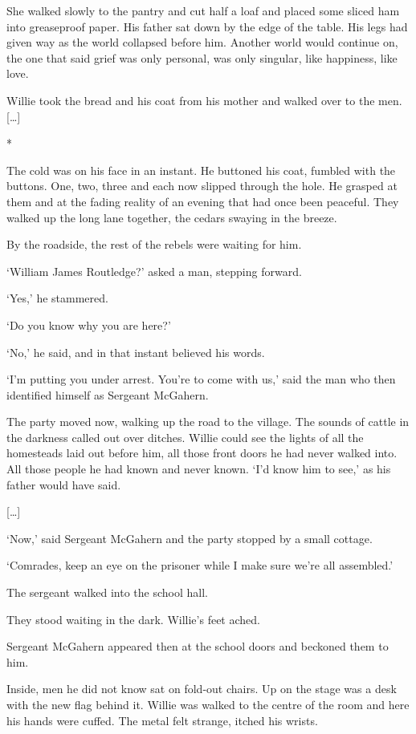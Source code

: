 \documentclass[10pt,a4paper]{article}
\begin{document}
She walked slowly to the pantry and cut half a loaf and placed some sliced ham into greaseproof paper. His father sat down by the edge of the table. His legs had given way as the world collapsed before him. Another world would continue on, the one that said grief was only personal, was only singular, like happiness, like love.

Willie took the bread and his coat from his mother and walked over to the men. […]

\begin{center}*\end{center}

The cold was on his face in an instant. He buttoned his coat, fumbled with the buttons. One, two, three and each now slipped through the hole. He grasped at them and at the fading reality of an evening that had once been peaceful. They walked up the long lane together, the cedars swaying in the breeze.

By the roadside, the rest of the rebels were waiting for him.

‘William James Routledge?’ asked a man, stepping forward.

‘Yes,’ he stammered.

‘Do you know why you are here?’

‘No,’ he said, and in that instant believed his words.

‘I’m putting you under arrest. You’re to come with us,’ said the man who then identified himself as Sergeant McGahern.

The party moved now, walking up the road to the village. The sounds of cattle in the darkness called out over ditches. Willie could see the lights of all the homesteads laid out before him, all those front doors he had never walked into. All those people he had known and never known. ‘I’d know him to see,’ as his father would have said.

[…]

‘Now,’ said Sergeant McGahern and the party stopped by a small cottage.

‘Comrades, keep an eye on the prisoner while I make sure we’re all assembled.’

The sergeant walked into the school hall.

They stood waiting in the dark. Willie’s feet ached.

Sergeant McGahern appeared then at the school doors and beckoned them to him.

Inside, men he did not know sat on fold-out chairs. Up on the stage was a desk with the new flag behind it. Willie was walked to the centre of the room and here his hands were cuffed. The metal felt strange, itched his wrists.
\end{document}
